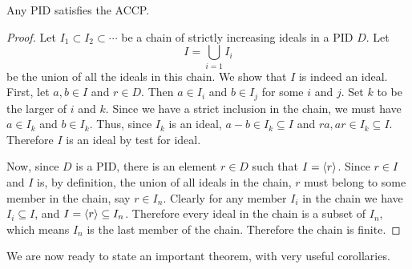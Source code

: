 \begin{lemma}\label{lemma-pid-satisfies-accp}
    Any PID satisfies the ACCP.
\end{lemma}
\begin{proof}
    Let $I_1 \subset I_2 \subset \cdots$ be a chain of strictly increasing ideals in a PID $D$. Let
    \[
        I = \bigcup_{i=1} I_i
    \]
    be the union of all the ideals in this chain. We show that $I$ is indeed an ideal. First, let $a,b\in I$ and $r \in D$. Then $a \in I_i$ and $b \in I_j$ for some $i$ and $j$. Set $k$ to be the larger of $i$ and $k$. Since we have a strict inclusion in the chain, we must have $a \in I_k$ and $b \in I_k$. Thus, since $I_k$ is an ideal, $a - b \in I_k \subseteq I$ and $ra, ar \in I_k \subseteq I$. Therefore $I$ is an ideal by test for ideal.

    Now, since $D$ is a PID, there is an element $r \in D$ such that $I = \left\langle r\right\rangle$. Since $r \in I$ and $I$ is, by definition, the union of all ideals in the chain, $r$ must belong to some member in the chain, say $r \in I_n$. Clearly for any member $I_i$ in the chain we have $I_i \subseteq I$, and $I = \left\langle r\right\rangle \subseteq I_n$. Therefore every ideal in the chain is a subset of $I_n$, which means $I_n$ is the last member of the chain. Therefore the chain is finite.
\end{proof}

We are now ready to state an important theorem, with very useful corollaries.

